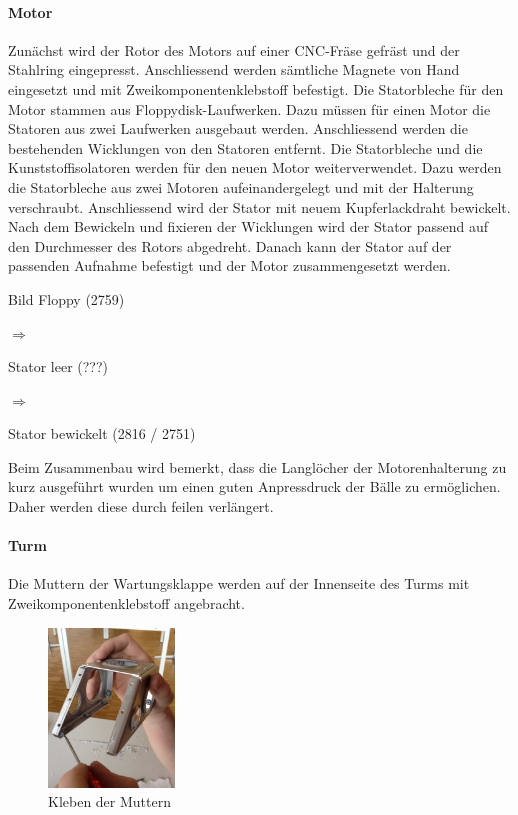 \paragraph{Motor}
Zunächst wird der Rotor des Motors auf einer CNC-Fräse gefräst und der 
Stahlring eingepresst. Anschliessend werden sämtliche Magnete von Hand 
eingesetzt und mit Zweikomponentenklebstoff befestigt. Die Statorbleche für 
den Motor stammen aus Floppydisk-Laufwerken. Dazu müssen für einen Motor die 
Statoren aus zwei Laufwerken ausgebaut werden. Anschliessend werden die 
bestehenden Wicklungen von den Statoren entfernt. Die Statorbleche und die 
Kunststoffisolatoren werden für den neuen Motor weiterverwendet. Dazu werden 
die Statorbleche aus zwei Motoren aufeinandergelegt und mit der Halterung 
verschraubt. Anschliessend wird der Stator mit neuem Kupferlackdraht 
bewickelt. Nach dem Bewickeln und fixieren der Wicklungen wird der Stator 
passend auf den Durchmesser des Rotors abgedreht. Danach kann der Stator auf 
der passenden Aufnahme befestigt und der Motor zusammengesetzt werden. 
\begin{center}
    \begin{minipage}[c]{0.2\textwidth}
        Bild Floppy (2759)
    \end{minipage}
    \begin{minipage}[c]{0.1\textwidth}
        \Huge$\Rightarrow$
    \end{minipage}
    \begin{minipage}[c]{0.2\textwidth}
        Stator leer (???)
    \end{minipage}
    \begin{minipage}[c]{0.1\textwidth}
        \Huge$\Rightarrow$
    \end{minipage}
    \begin{minipage}[c]{0.2\textwidth}
        Stator bewickelt (2816 / 2751)
    \end{minipage}
\end{center}

Beim Zusammenbau wird bemerkt, dass die Langlöcher der Motorenhalterung zu kurz ausgeführt wurden um einen guten Anpressdruck der Bälle zu ermöglichen. Daher werden diese durch feilen verlängert.

\paragraph{Turm}
Die Muttern der Wartungsklappe werden auf der Innenseite des Turms mit Zweikomponentenklebstoff 
angebracht. 

\begin{figure}[h!]          
	\centering             
	\includegraphics[width=0.3\textwidth]{fig/IMG_2292.JPG}
	\caption{Kleben der Muttern}
	\label{fig:Muttern Kleben}        
\end{figure}


